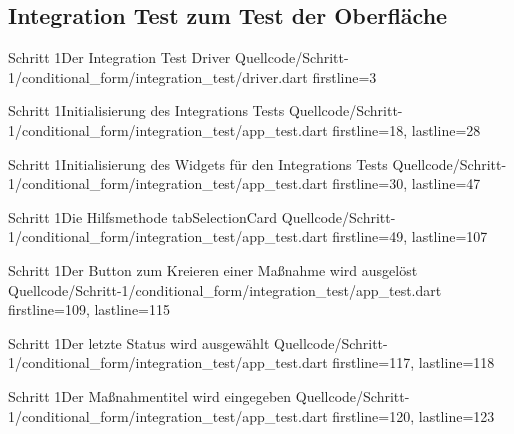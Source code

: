 {\cleardoublepage
\subsection{Integration Test zum Test der Oberfläche}

\begin{alexlisting}{Schritt 1}{Der Integration Test Driver}
  {Quellcode/Schritt-1/conditional_form/integration_test/driver.dart}
  {firstline=3}
  \label{lst:Schritt1IntegrationTestDriver}
\end{alexlisting}


\begin{alexlisting}{Schritt 1}{Initialisierung des Integrations Tests}
  {Quellcode/Schritt-1/conditional_form/integration_test/app_test.dart}
  {firstline=18, lastline=28}
  \label{lst:Schritt1IntegrationsTestInitialisierung}
\end{alexlisting}


\begin{alexlisting}{Schritt 1}{Initialisierung des Widgets für den Integrations Tests}
  {Quellcode/Schritt-1/conditional_form/integration_test/app_test.dart}
  {firstline=30, lastline=47}
  \label{lst:Schritt1IntegrationsTestWidgetInitialisierung}
\end{alexlisting}

\begin{alexlisting}{Schritt 1}{Die Hilfsmethode tabSelectionCard}
  {Quellcode/Schritt-1/conditional_form/integration_test/app_test.dart}
  {firstline=49, lastline=107}
  \label{lst:Schritt1HilfsmethodeTabSelectionCard}
\end{alexlisting}

\begin{alexlisting}{Schritt 1}{Der Button zum Kreieren einer Maßnahme wird ausgelöst}
  {Quellcode/Schritt-1/conditional_form/integration_test/app_test.dart}
  {firstline=109, lastline=115}
  \label{lst:Schritt1ButtonKreierenMaßnahmeAusgeloest}
\end{alexlisting}

\begin{alexlisting}{Schritt 1}{Der letzte Status wird ausgewählt}
  {Quellcode/Schritt-1/conditional_form/integration_test/app_test.dart}
  {firstline=117, lastline=118}
  \label{lst:Schritt1LetzterStatusWirdAusgewählt}
\end{alexlisting}


\begin{alexlisting}{Schritt 1}{Der Maßnahmentitel wird eingegeben}
  {Quellcode/Schritt-1/conditional_form/integration_test/app_test.dart}
  {firstline=120, lastline=123}
  \label{lst:Schritt1MaßnahmentitelWirdEingegeben}
\end{alexlisting}



}

